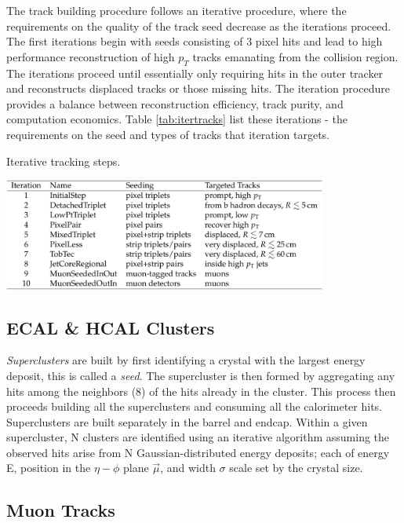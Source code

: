 The track building procedure follows an iterative procedure, where the requirements on the quality of the track seed decrease as the iterations proceed. The first iterations begin with seeds consisting of 3 pixel hits and lead to high performance reconstruction of high $p_{T}$ tracks emanating from the collision region. The iterations proceed until essentially only requiring hits in the outer tracker and reconstructs displaced tracks or those missing hits. The iteration procedure provides a balance between reconstruction efficiency, track purity, and computation economics. Table \ref{tab:itertracks} list these iterations - the requirements on the seed and types of tracks that iteration targets.

\begin{table}[h]
\caption{Iterative tracking steps.\cite{CMS-PRF-14-001}}
\centering
\includegraphics[width=0.8\textwidth]{figs/itertracks.png}
\label{tab:itertracks}
\end{table}

\subsection{ECAL \& HCAL Clusters}

\textit{Superclusters} are built by first identifying a crystal with the largest energy deposit, this is called a \textit{seed}. The supercluster is then formed by aggregating any hits among the neighbors (8) of the hits already in the cluster. This process then proceeds building all the superclusters and consuming all the calorimeter hits. Superclusters are built separately in the barrel and endcap. Within a given supercluster, N clusters are identified using an iterative algorithm assuming the observed hits arise from N Gaussian-distributed energy deposits; each of energy E, position in the $\eta-\phi$ plane $\vec{\mu}$, and width $\sigma$ scale set by the crystal size.

\subsection{Muon Tracks}

